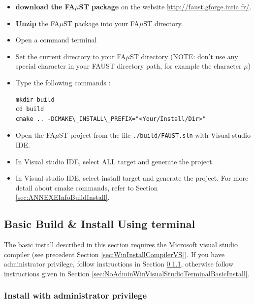 \begin{itemize}
\item \textbf{download the FA$\mu$ST package} on the website  \url{http://faust.gforge.inria.fr/}. 
\item \textbf{Unzip} the FA$\mu$ST package into your FA$\mu$ST directory. 

\item Open a command terminal
\item Set the current directory to your FA$\mu$ST directory (NOTE: don't use any special character in your FAUST directory path, for example the character $\mu$)
\item Type the following commands : 
\begin{lstlisting}
mkdir build
cd build
cmake .. -DCMAKE\_INSTALL\_PREFIX="<Your/Install/Dir>"
\end{lstlisting}
\item Open the FA$\mu$ST project from the file \texttt{./build/FAUST.sln} with Visual studio IDE.
\item In Visual studio IDE, select ALL target and generate the project.
\item In Visual studio IDE, select install target and generate the project.
For more detail about cmake commands, refer to Section \ref{sec:ANNEXEInfoBuildInstall}.

\end{itemize}

\subsection{Basic Build \& Install Using terminal}\label{sec:WinVisualStudioTerminalBasicInstall}
The basic install described in this section requires the Microsoft visual studio compiler (see precedent Section \ref{sec:WinInstallCompilerVS}).
If you have administrator privilege, follow instructions in Section \ref{sec:AdminWinVisualStudioTerminalBasicInstall}, otherwise follow instructions given in Section \ref{sec:NoAdminWinVisualStudioTerminalBasicInstall}.

\subsubsection{Install with administrator privilege}
\label{sec:AdminWinVisualStudioTerminalBasicInstall}

